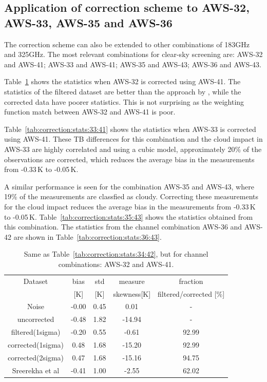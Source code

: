 \documentclass[12pt]{article}
\begin{document}
\subsection{Application of correction scheme to AWS-32, AWS-33, AWS-35 and AWS-36}
The correction scheme can also be extended to other combinations of 183GHz and
325GHz. The most relevant combinations for clear-sky screening are: AWS-32 and
AWS-41; AWS-33 and AWS-41; AWS-35 and AWS-43; AWS-36 and AWS-43.

Table~\ref{tab:correction:stats:32:41} shows the statistics when AWS-32 is
corrected using AWS-41. The statistics of the filtered dataset are better than
the approach by \cite{rekha2012potential}, while the corrected data have poorer
statistics. This is not surprising as the weighting function match between 
AWS-32 and  AWS-41 is poor.

Table~\ref{tab:correction:stats:33:41} shows the statistics when AWS-33 is
corrected using AWS-41. These TB differences for this combination and the cloud
impact in AWS-33 are highly correlated and using a cubic model, approximately
20\% of the observations are corrected, which reduces the average bias in the
measurements from -0.33\,K to -0.05\,K.

A similar performance is seen for the combination AWS-35 and AWS-43, where 19\%
of the measurements are classfied as cloudy. Correcting these measurements for
the cloud impact reduces the average bias in the measurements from -0.33\,K to
-0.05\,K. Table~\ref{tab:correction:stats:35:43} shows the statistics obtained
from this combination. The statistics from the channel combination AWS-36 and
AWS-42 are shown in Table~\ref{tab:correction:stats:36:43}.
\begin{table}[!bt]
	\centering
	\begin{tabular}[b]{c|c|c|c|c}
		Dataset  		  &   bias &   std &   measure & fraction \\
		&   [K]  &   [K] & skewness[K] & filtered/corrected [\%]\\
		\hline
 Noise             &  -0.00 &  0.45 &               0.01 &               - \\
uncorrected       &  -0.48 &  1.82 &             -14.94 &                - \\
filtered(1sigma)  &  -0.20 &  0.55 &              -0.61 &               92.99 \\
corrected(1sigma) &   0.48 &  1.68 &             -15.20 &               92.99 \\
corrected(2sigma) &   0.47 &  1.68 &             -15.16 &               94.75 \\
Sreerekha et al   &  -0.41 &  1.00 &              -2.55 &               62.02 \\	
		\hline
	\end{tabular}
	\caption{Same as Table~\ref{tab:correction:stats:34:42}, but for channel combinations: AWS-32 and AWS-41.   }
	\label{tab:correction:stats:32:41}
\end{table}
\end{document}
